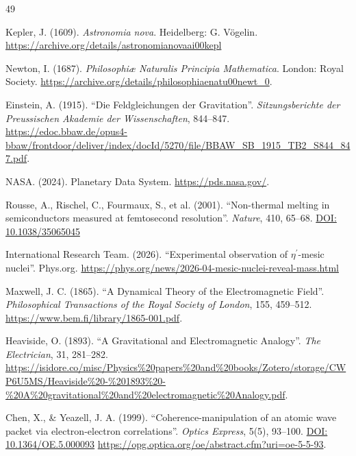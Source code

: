 \documentclass[11pt, a4paper]{article}
\newcommand{\doi}[1]{\href{https://doi.org/#1}{DOI: #1}}
\begin{document}
\begin{thebibliography}{49}

  Kepler, J. (1609). \textit{Astronomia nova}. Heidelberg: G. Vögelin.
  \url{https://archive.org/details/astronomianovaai00kepl}

  Newton, I. (1687). \textit{Philosophiæ Naturalis Principia Mathematica}. London: Royal Society. 
  \url{https://archive.org/details/philosophiaenatu00newt_0}.

  Einstein, A. (1915). ``Die Feldgleichungen der Gravitation''. \textit{Sitzungsberichte der Preussischen Akademie der Wissenschaften}, 844–847. 
  \url{https://edoc.bbaw.de/opus4-bbaw/frontdoor/deliver/index/docId/5270/file/BBAW_SB_1915_TB2_S844_847.pdf}.

  NASA. (2024). Planetary Data System. \url{https://pds.nasa.gov/}.

  Rousse, A., Rischel, C., Fourmaux, S., et al. (2001). ``Non-thermal melting in semiconductors measured at femtosecond resolution''. \textit{Nature}, 410, 65--68. 
  \doi{10.1038/35065045}

  International Research Team. (2026). ``Experimental observation of $\eta^{\prime}$-mesic nuclei''. Phys.org. 
  \url{https://phys.org/news/2026-04-mesic-nuclei-reveal-mass.html}

  Maxwell, J. C. (1865). ``A Dynamical Theory of the Electromagnetic Field''. \textit{Philosophical Transactions of the Royal Society of London}, 155, 459–512. 
  \url{https://www.bem.fi/library/1865-001.pdf}.

  Heaviside, O. (1893). ``A Gravitational and Electromagnetic Analogy''. \textit{The Electrician}, 31, 281–282. 
  \url{https://isidore.co/misc/Physics%20papers%20and%20books/Zotero/storage/CWP6U5MS/Heaviside%20-%201893%20-%20A%20gravitational%20and%20electromagnetic%20Analogy.pdf}.

  Chen, X., \& Yeazell, J. A. (1999). ``Coherence-manipulation of an atomic wave packet via electron-electron correlations''. \textit{Optics Express}, 5(5), 93--100. 
  \doi{10.1364/OE.5.000093} \url{https://opg.optica.org/oe/abstract.cfm?uri=oe-5-5-93}.


\end{thebibliography}
\end{document}
